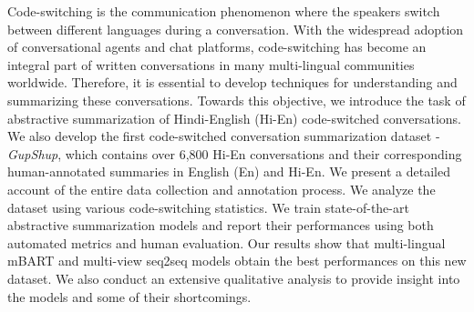 Code-switching is the communication phenomenon where the speakers switch between different languages during a conversation. With the widespread adoption of conversational agents and chat platforms, code-switching has become an integral part of written conversations in many multi-lingual communities worldwide. Therefore, it is essential to develop techniques for understanding and summarizing these conversations. Towards this objective, we introduce the task of abstractive summarization of Hindi-English (Hi-En) code-switched conversations. We also develop the first code-switched conversation summarization dataset - \textit{GupShup}, which contains over 6,800 Hi-En conversations and their corresponding human-annotated summaries in English (En) and Hi-En. We present a detailed account of the entire data collection and annotation process. We analyze the dataset using various code-switching statistics. We train state-of-the-art abstractive summarization models and report their performances using both automated metrics and human evaluation. Our results show that multi-lingual mBART and multi-view seq2seq models obtain the best performances on this new dataset. We also conduct an extensive qualitative analysis to provide insight into the models and some of their shortcomings.
